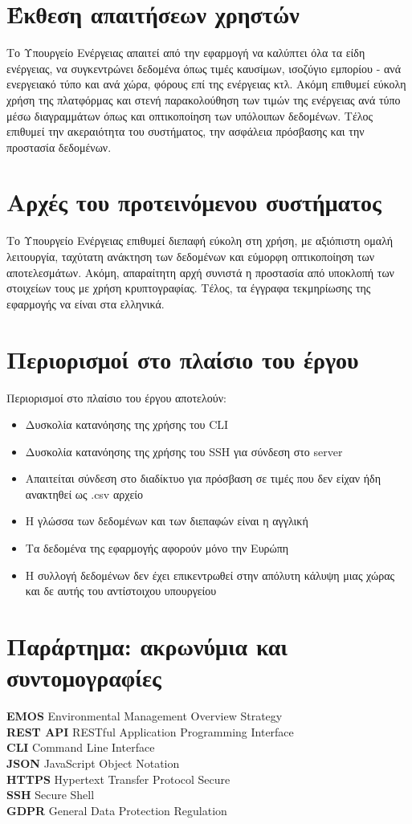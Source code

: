\documentclass[a4paper,12pt, oneside]{article}
\begin{document}
\section{Έκθεση απαιτήσεων χρηστών}
Το Υπουργείο Ενέργειας απαιτεί από την εφαρμογή να καλύπτει όλα τα είδη ενέργειας,  να συγκεντρώνει δεδομένα όπως τιμές καυσίμων, ισοζύγιο εμπορίου - ανά ενεργειακό τύπο και ανά χώρα, φόρους επί της ενέργειας κτλ.  Ακόμη επιθυμεί εύκολη χρήση της πλατφόρμας και στενή παρακολούθηση των τιμών της ενέργειας ανά τύπο μέσω διαγραμμάτων όπως και οπτικοποίηση των υπόλοιπων δεδομένων. Τέλος επιθυμεί την ακεραιότητα του συστήματος, την ασφάλεια πρόσβασης και την προστασία δεδομένων.

\newpage
\section{Αρχές του προτεινόμενου συστήματος}
Το Υπουργείο Ενέργειας επιθυμεί διεπαφή εύκολη στη χρήση,  με αξιόπιστη ομαλή λειτουργία, ταχύτατη ανάκτηση των δεδομένων και εύμορφη οπτικοποίηση των αποτελεσμάτων. Ακόμη, απαραίτητη αρχή συνιστά η προστασία από υποκλοπή των στοιχείων τους με χρήση κρυπτογραφίας. Τέλος, τα έγγραφα τεκμηρίωσης της εφαρμογής να είναι στα ελληνικά.


\section{Περιορισμοί στο πλαίσιο του έργου}
Περιορισμοί στο πλαίσιο του έργου αποτελούν:
\begin{itemize}
  \item Δυσκολία κατανόησης της χρήσης του \textlatin{CLI}
  \item Δυσκολία κατανόησης της χρήσης του \textlatin{SSH} για σύνδεση στο \textlatin{server}
  \item Απαιτείται σύνδεση στο διαδίκτυο για πρόσβαση σε τιμές που δεν είχαν ήδη ανακτηθεί ως \textlatin{.csv} αρχείο
  \item Η γλώσσα των δεδομένων και των διεπαφών είναι η αγγλική
    \item Τα δεδομένα της εφαρμογής αφορούν μόνο την Ευρώπη
    \item Η συλλογή δεδομένων δεν έχει επικεντρωθεί στην απόλυτη κάλυψη μιας χώρας και  δε αυτής του αντίστοιχου υπουργείου 
\end{itemize}
\newpage

\section{Παράρτημα: ακρωνύμια και συντομογραφίες}
\textlatin{\textbf{EMOS} Environmental Management Overview Strategy\\
\textbf{REST API}  RESTful Application Programming Interface\\
\textbf{CLI} Command Line Interface\\
\textbf{JSON} JavaScript Object Notation\\
\textbf{HTTPS} Hypertext Transfer Protocol Secure\\
\textbf{SSH} Secure Shell \\
\textbf{GDPR} General Data Protection Regulation
}
\end{document}
